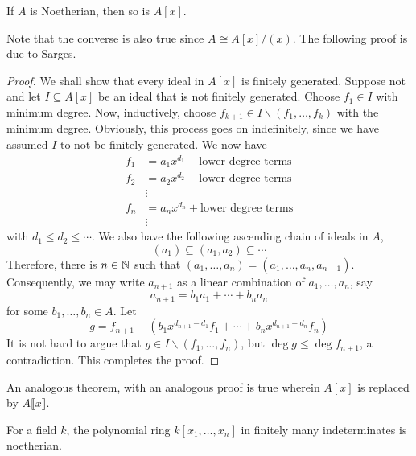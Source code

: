 \begin{theorem}
    If $A$ is Noetherian, then so is $A[x]$.
\end{theorem}
Note that the converse is also true since $A\cong A[x]/(x)$. The following proof is due to Sarges.
\begin{proof}
    We shall show that every ideal in $A[x]$ is finitely generated. Suppose not and let $I\subseteq A[x]$ be an ideal that is not finitely generated. Choose $f_1\in I$ with minimum degree. Now, inductively, choose $f_{k + 1}\in I\backslash(f_1,\ldots,f_k)$ with the minimum degree. Obviously, this process goes on indefinitely, since we have assumed $I$ to not be finitely generated. We now have 
    \begin{align*}
        f_1 &= a_1x^{d_1} + \text{lower degree terms}\\
        f_2 &= a_2x^{d_2} + \text{lower degree terms}\\
        &\vdots\\
        f_n &= a_nx^{d_n} + \text{lower degree terms}\\
        &\vdots
    \end{align*}
    with $d_1\le d_2\le\cdots$. We also have the following ascending chain of ideals in $A$, 
    \begin{equation*}
        (a_1)\subseteq(a_1,a_2)\subseteq\cdots
    \end{equation*}
    Therefore, there is $n\in\mathbb{N}$ such that $(a_1,\ldots,a_n) = (a_1,\ldots,a_n,a_{n + 1})$. Consequently, we may write $a_{n + 1}$ as a linear combination of $a_1,\ldots,a_n$, say 
    \begin{equation*}
        a_{n + 1} = b_1a_1 + \cdots + b_na_n
    \end{equation*}
    for some $b_1,\ldots,b_n\in A$. Let 
    \begin{equation*}
        g = f_{n + 1} - (b_1x^{d_{n + 1} - d_1}f_1 + \cdots + b_nx^{d_{n + 1} - d_n}f_n)
    \end{equation*}
    It is not hard to argue that $g\in I\backslash(f_1,\ldots,f_n)$, but $\deg g\le\deg f_{n + 1}$, a contradiction. This completes the proof.
\end{proof}

An analogous theorem, with an analogous proof is true wherein $A[x]$ is replaced by $A\llbracket x\rrbracket$.

\begin{corollary}
    For a field $k$, the polynomial ring $k[x_1,\ldots,x_n]$ in finitely many indeterminates is noetherian.
\end{corollary}

